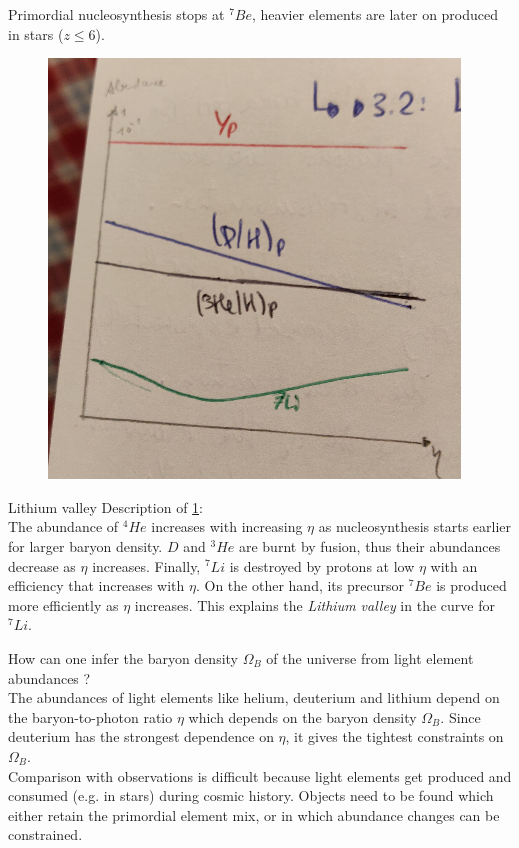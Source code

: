 Primordial nucleosynthesis stops at ${}^7 Be$, heavier elements are later on produced in stars ($z\leq 6$).
\begin{figure}[h!]
	\centering
	\includegraphics[width=0.5\linewidth]{gfx/nucleosynthesisAbundance}
	\caption{}
	\label{fig:nucleosynthesisabundance}
\end{figure}
\begin{mybox}{Lithium valley}
Description of \ref{fig:nucleosynthesisabundance}:\\
The abundance of ${}^4He$ increases with increasing $\eta$ as nucleosynthesis starts earlier for larger baryon density. $D$ and ${}^3 He$ are burnt by fusion, thus their abundances decrease as $\eta$ increases. Finally, ${}^7 Li$ is destroyed by protons at low $\eta$ with an efficiency that increases with $\eta$. On the other hand, its precursor ${}^7 Be$ is produced more efficiently as $\eta$ increases. This explains the \emph{Lithium valley} in the curve for ${}^7 Li$.
\end{mybox}
\vspace{1cm}
How can one infer the baryon density $\Omega_B$ of the universe from light element abundances ?\\
The abundances of light elements like helium, deuterium and lithium depend on the baryon-to-photon ratio $\eta$ which depends on the baryon density $\Omega_B$. Since deuterium has the strongest dependence on $\eta$, it gives the tightest constraints on $\Omega_B$.\\
Comparison with observations is difficult because light elements get produced and consumed (e.g. in stars) during cosmic history. Objects need to be found which either retain the primordial element mix, or in which abundance changes can be constrained.




























